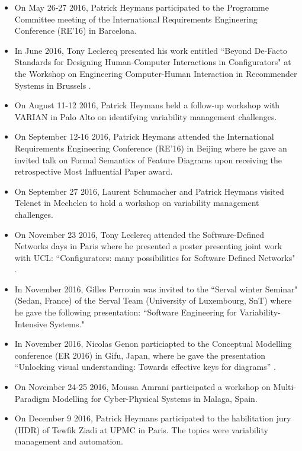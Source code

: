 \begin{itemize}
\item On May 26-27 2016, Patrick Heymans participated to the Programme Committee meeting of the International Requirements Engineering Conference (RE'16) in Barcelona.

\item In June 2016, Tony Leclercq presented his work entitled ``Beyond De-Facto Standards for Designing Human-Computer Interactions in Configurators" at the Workshop on Engineering Computer-Human Interaction in Recommender Systems in Brussels \cite{Lecelercq16a}.  

\item On August 11-12 2016, Patrick Heymans held a follow-up workshop with VARIAN in Palo Alto on identifying variability management challenges.

\item On September 12-16 2016, Patrick Heymans attended the International Requirements Engineering Conference (RE'16) in Beijing where he gave an invited talk on Formal Semantics of Feature Diagrams upon receiving the retrospective Most Influential Paper award. 

\item On September 27 2016, Laurent Schumacher and Patrick Heymans visited Telenet in Mechelen to hold a workshop on variability management challenges.

\item On November 23 2016, Tony Leclercq attended the Software-Defined Networks days in Paris where he presented a poster presenting  joint work with UCL: ``Configurators: many possibilities for Software Defined Networks" \cite{Leclercq16}.

\item In November 2016, Gilles Perrouin was invited to the ``Serval winter Seminar" (Sedan, France) of the Serval Team (University of Luxembourg, SnT)  where he gave the following presentation: ``Software Engineering for Variability-Intensive Systems."

\item In November 2016, Nicolas Genon particiapted to the Conceptual Modelling conference (ER 2016) in Gifu, Japan, where he gave the presentation ``Unlocking visual understanding: Towards effective keys for diagrams'' \cite{Genon16}.

\item On November 24-25 2016, Moussa Amrani participated a workshop on Multi-Paradigm Modelling for Cyber-Physical Systems in Malaga, Spain.

\item On December 9 2016, Patrick Heymans participated to the habilitation jury (HDR) of Tewfik Ziadi at UPMC in Paris. The topics were variability management and automation. 
\end{itemize}

